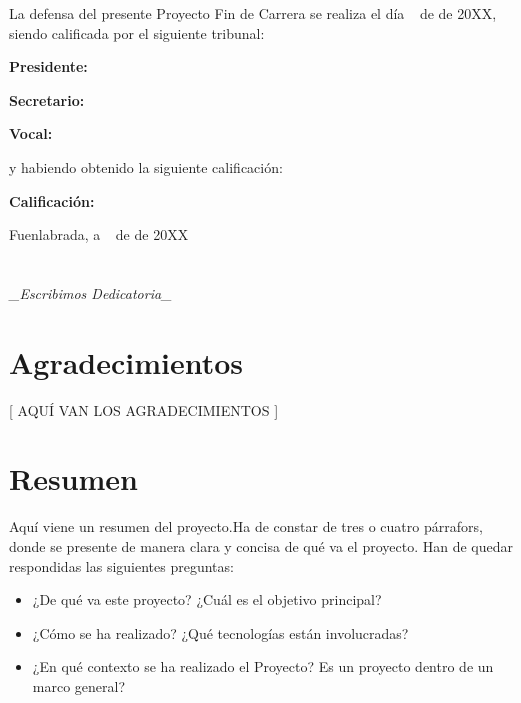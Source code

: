 \documentclass[a4paper, 12pt]{book}
\begin{document}
\vspace{1cm}
La defensa del presente Proyecto Fin de Carrera se realiza el día \qquad$\;\,$ de \qquad\qquad\qquad\qquad \newline de 20XX, siendo calificada por el siguiente tribunal:

\vspace{0.5cm}
\textbf{Presidente:}

\vspace{1.2cm}
\textbf{Secretario:}

\vspace{1.2cm}
\textbf{Vocal:}

\vspace{1.2cm}
y habiendo obtenido la siguiente calificación:

\vspace{1cm}
\textbf{Calificación:}

\vspace{1cm}
\begin{flushright} Fuenlabrada, a \qquad$\;\,$ de
  \qquad\qquad\qquad\qquad de 20XX
\end{flushright}


\chapter*{}
\begin{flushright}
  \textit{\_Escribimos Dedicatoria\_}
\end{flushright}


\chapter*{Agradecimientos}

[ AQUÍ VAN LOS AGRADECIMIENTOS ]

\chapter*{Resumen}

Aquí viene un resumen del proyecto.Ha de constar de tres o cuatro párrafors, donde se presente de manera clara y concisa de qué va el proyecto.
Han de quedar respondidas las siguientes preguntas:
\begin{itemize}
  \item ¿De qué va este proyecto? ¿Cuál es el objetivo principal?
  \item ¿Cómo se ha realizado? ¿Qué tecnologías están involucradas?
  \item ¿En qué contexto se ha realizado el Proyecto? Es un proyecto dentro de un marco general?
\end{itemize}
\end{document}
